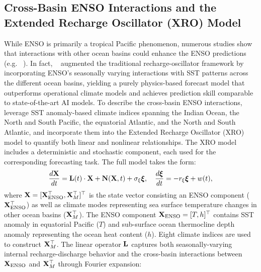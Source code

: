\subsection{Cross-Basin ENSO Interactions and the Extended Recharge Oscillator (XRO) Model}

While ENSO is primarily a tropical Pacific phenomenon, numerous studies show that interactions with other ocean basins could enhance the ENSO predictions (e.g. ~\cite{zhao2024xro, cai2019pantropical}). In fact, ~\cite{zhao2024xro} augmented the traditional recharge-oscillator framework by incorporating ENSO's seasonally varying interactions with SST patterns across the different ocean basins, yielding a purely physics-based forecast model that outperforms operational climate models and achieves prediction skill comparable to state-of-the-art AI models. To describe the cross-basin ENSO interactions, \cite{zhao2024xro} leverage SST anomaly-based climate indices spanning the Indian Ocean, the North and South Pacific, the equatorial Atlantic, and the North and South Atlantic, and incorporate them into the Extended Recharge Oscillator (XRO) model to quantify both linear and nonlinear relationships. The XRO model includes a deterministic and stochastic component, each used for the corresponding forecasting task. The full model takes the form: %
\begin{align}
    \frac{d\mathbf{X}}{dt} = \mathbf{L}(t) \cdot \mathbf{X} + \mathbf{N}(\mathbf{X}, t) + \sigma_\xi \boldsymbol{\xi}, \quad \frac{d\boldsymbol{\xi}}{dt} = -r_\xi \boldsymbol{\xi} + w(t), \label{eq:xro_noise}
\end{align}
\noindent where $\mathbf{X} = [\mathbf{X}_{\text{ENSO}}^\top, \mathbf{X}_M^\top]^\top$ is the state vector consisting an ENSO component ($\mathbf{X}_{\text{ENSO}}^\top$) as well as climate modes representing sea surface temperature changes in other ocean basins ($\mathbf{X}_M^\top$). The ENSO component $\mathbf{X}_{\text{ENSO}} = [T, h]^\top$ contains SST anomaly in equatorial Pacific ($T$) and sub-surface ocean thermocline depth anomaly representing the ocean heat content ($h$). Eight climate indices are used to construct $\mathbf{X}_M^\top$. The linear operator $\mathbf{L}$ captures both seasonally-varying internal recharge-discharge behavior and the cross-basin interactions between $\mathbf{X}_{\text{ENSO}}$ and $\mathbf{X}_M^\top$ through Fourier expansion:

